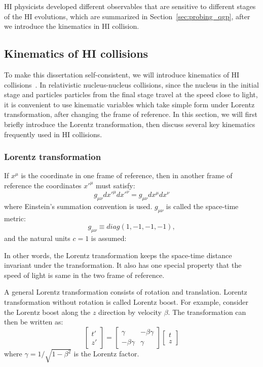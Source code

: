 HI physicists developed different observables that are sensitive to different stages of the HI evolutions, which are summarized in Section~\ref{sec:probing_qgp}, after we introduce the kinematics in HI collision.



\subsection{Kinematics of HI collisions}

To make this dissertation self-consistent, we will introduce kinematics of HI collisions~\cite{Chaudhuri:2012yt}. In relativistic nucleus-nucleus collisions, since the nucleus in the initial stage and particles particles from the final stage travel at the speed close to light, it is convenient to use kinematic variables which take simple form under Lorentz transformation, after changing the frame of reference. In this section, we will first briefly introduce the Lorentz transformation, then discuss several key kinematics frequently used in HI collisions.



\subsubsection{Lorentz transformation}

If $x^\mu$ is the coordinate in one frame of reference, then in another frame of reference the coordinates $x'^{\mu}$ must satisfy:
\begin{equation}
g_{\mu\nu} dx'^\mu dx'^\nu = g_{\mu\nu} dx^\mu dx^\nu
\end{equation}
where Einstein's summation convention is used. $g_{\mu\nu}$ is called the space-time metric:
\begin{equation}
g_{\mu\nu} \equiv diag(1, -1, -1, -1),
\end{equation}
and the natural units $c=1$ is assumed:

In other words, the Lorentz transformation keeps the space-time distance invariant under the transformation. It also has one special property that the speed of light is same in the two frame of reference.

A general Lorentz transformation consists of rotation and translation. Lorentz transformation without rotation is called Lorentz boost. For example, consider the Lorentz boost along the $z$ direction by velocity $\beta$. The transformation can then be written as:
\begin{equation}
\begin{bmatrix}
t' \\
z'
\end{bmatrix}
=
\begin{bmatrix}
\gamma & -\beta\gamma \\
-\beta\gamma & \gamma
\end{bmatrix}
\begin{bmatrix}
t \\
z
\end{bmatrix}
\end{equation}
where $\gamma = 1/\sqrt{1-\beta^2}$ is the Lorentz factor.



